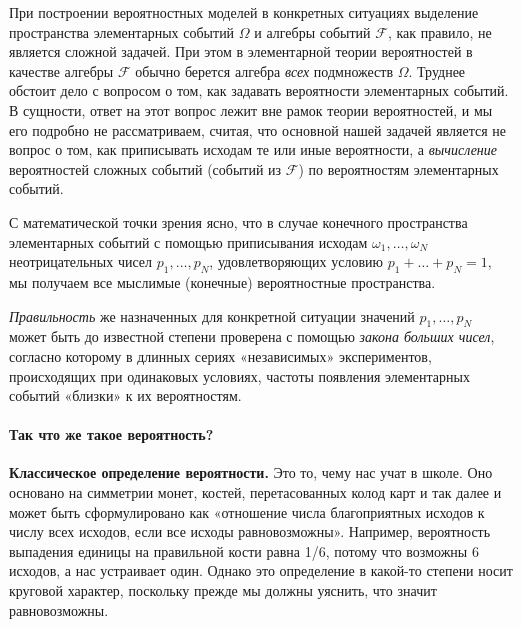 \documentclass[11pt,a4paper]{article}
\begin{document}
При построении вероятностных моделей в конкретных ситуациях выделение
пространства элементарных событий \(\Omega\) и алгебры событий
\(\mathcal{F}\), как правило, не является сложной задачей. При этом в
элементарной теории вероятностей в качестве алгебры \(\mathcal{F}\)
обычно берется алгебра \emph{всех} подмножеств \(\Omega\). Труднее
обстоит дело с вопросом о том, как задавать вероятности элементарных
событий. В сущности, ответ на этот вопрос лежит вне рамок теории
вероятностей, и мы его подробно не рассматриваем, считая, что основной
нашей задачей является не вопрос о том, как приписывать исходам те или
иные вероятности, а \emph{вычисление} вероятностей сложных событий
(событий из \(\mathcal{F}\)) по вероятностям элементарных событий.

С математической точки зрения ясно, что в случае конечного пространства
элементарных событий с помощью приписывания исходам
\(\omega_1, \ldots , \omega_N\) неотрицательных чисел
\(p_1, \ldots , p_N\), удовлетворяющих условию
\(p_1 + \ldots + p_N = 1\), мы получаем все мыслимые (конечные)
вероятностные пространства.

\emph{Правильность} же назначенных для конкретной ситуации значений
\(p_1, \ldots , p_N\) может быть до известной степени проверена с
помощью \emph{закона больших чисел}, согласно которому в длинных сериях
«независимых» экспериментов, происходящих при одинаковых условиях,
частоты появления элементарных событий «близки» к их вероятностям.

    \hypertarget{ux442ux430ux43a-ux447ux442ux43e-ux436ux435-ux442ux430ux43aux43eux435-ux432ux435ux440ux43eux44fux442ux43dux43eux441ux442ux44c}{%
\paragraph{Так что же такое
вероятность?}\label{ux442ux430ux43a-ux447ux442ux43e-ux436ux435-ux442ux430ux43aux43eux435-ux432ux435ux440ux43eux44fux442ux43dux43eux441ux442ux44c}}

\textbf{Классическое определение вероятности.} Это то, чему нас учат в
школе. Оно основано на симметрии монет, костей, перетасованных колод
карт и так далее и может быть сформулировано как «отношение числа
благоприятных исходов к числу всех исходов, если все исходы
равновозможны». Например, вероятность выпадения единицы на правильной
кости равна 1/6, потому что возможны 6 исходов, а нас устраивает один.
Однако это определение в какой-то степени носит круговой характер,
поскольку прежде мы должны уяснить, что значит равновозможны.
\end{document}
